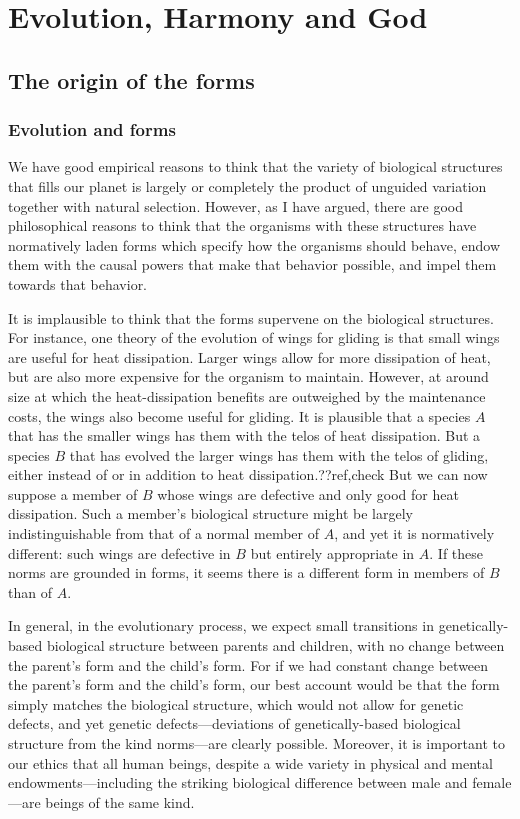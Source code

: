 \def\mychapter{XI}

\chapter{Evolution, Harmony and God}\label{ch:God}
\section{The origin of the forms}
\subsection{Evolution and forms}
We have good empirical reasons to think that the variety of biological structures that fills our planet 
is largely or completely the product of unguided variation together with natural selection. However, as
I have argued, there are good philosophical reasons to think that the organisms with these structures
have normatively laden forms which specify how the organisms should behave, endow them with the causal
powers that make that behavior possible, and impel them towards that behavior. 

It is implausible to think that the forms supervene on the biological structures. For instance, one theory
of the evolution of wings for gliding is that small wings are useful for heat dissipation. Larger wings allow
for more dissipation of heat, but are also more expensive for the organism to maintain. However, at around
size at which the heat-dissipation benefits are outweighed by the maintenance costs, the wings also become
useful for gliding. It is plausible that a species $A$ that has the smaller wings has them with the telos of
heat dissipation. But a species $B$ that has evolved the larger wings has them with the telos of gliding, either
instead of or in addition to heat dissipation.??ref,check But we can now suppose a member of $B$ whose wings are defective
and only good for heat dissipation. Such a member's biological structure might be largely indistinguishable from
that of a normal member of $A$, and yet it is normatively different: such wings are defective in $B$ but entirely
appropriate in $A$. If these norms are grounded in forms, it seems there is a different form in members of $B$ than
of $A$.

In general, in the evolutionary process, we expect small transitions in genetically-based biological structure 
between parents and children, with no change between the parent's form and the child's form. For if we had constant change
between the parent's form and the child's form, our best account would be that the form simply matches the
biological structure, which would not allow for genetic defects, and yet genetic defects---deviations of genetically-based
biological structure from the kind norms---are clearly possible.  Moreover, it is important to our ethics
that all human beings, despite a wide variety in physical and mental endowments---including the striking biological
difference between male and female---are beings of the same kind. 

